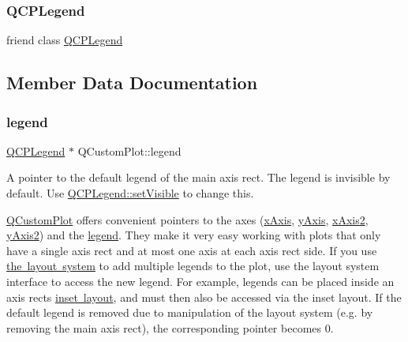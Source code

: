 \mbox{\label{class_q_custom_plot_a8429035e7adfbd7f05805a6530ad5e3b}} 
\subsubsection{\texorpdfstring{QCPLegend}{QCPLegend}}
{\footnotesize\ttfamily friend class \mbox{\hyperlink{class_q_c_p_legend}{Q\+C\+P\+Legend}}\hspace{0.3cm}{\ttfamily [friend]}}



\subsection{Member Data Documentation}
\mbox{\label{class_q_custom_plot_a4eadcd237dc6a09938b68b16877fa6af}} 
\subsubsection{\texorpdfstring{legend}{legend}}
{\footnotesize\ttfamily \mbox{\hyperlink{class_q_c_p_legend}{Q\+C\+P\+Legend}} $\ast$ Q\+Custom\+Plot\+::legend}

A pointer to the default legend of the main axis rect. The legend is invisible by default. Use \mbox{\hyperlink{class_q_c_p_layerable_a3bed99ddc396b48ce3ebfdc0418744f8}{Q\+C\+P\+Legend\+::set\+Visible}} to change this.

\mbox{\hyperlink{class_q_custom_plot}{Q\+Custom\+Plot}} offers convenient pointers to the axes (\mbox{\hyperlink{class_q_custom_plot_a9a79cd0158a4c7f30cbc702f0fd800e4}{x\+Axis}}, \mbox{\hyperlink{class_q_custom_plot_af6fea5679725b152c14facd920b19367}{y\+Axis}}, \mbox{\hyperlink{class_q_custom_plot_ada41599f22cad901c030f3dcbdd82fd9}{x\+Axis2}}, \mbox{\hyperlink{class_q_custom_plot_af13fdc5bce7d0fabd640f13ba805c0b7}{y\+Axis2}}) and the \mbox{\hyperlink{class_q_custom_plot_a4eadcd237dc6a09938b68b16877fa6af}{legend}}. They make it very easy working with plots that only have a single axis rect and at most one axis at each axis rect side. If you use \mbox{\hyperlink{}{the layout system}} to add multiple legends to the plot, use the layout system interface to access the new legend. For example, legends can be placed inside an axis rect\textquotesingle{}s \mbox{\hyperlink{class_q_c_p_axis_rect_a949f803466619924c7018df4b511ae10}{inset layout}}, and must then also be accessed via the inset layout. If the default legend is removed due to manipulation of the layout system (e.\+g. by removing the main axis rect), the corresponding pointer becomes 0.

